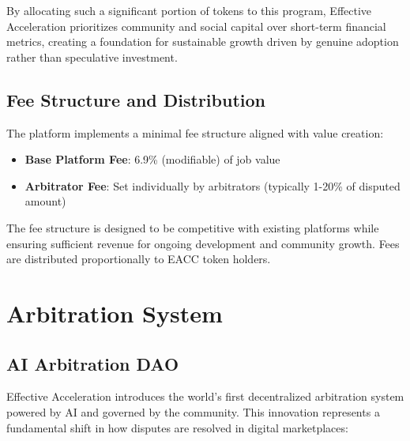 \documentclass{article}
\begin{document}
By allocating such a significant portion of tokens to this program, Effective Acceleration prioritizes community and social capital over short-term financial metrics, creating a foundation for sustainable growth driven by genuine adoption rather than speculative investment.

\subsection{Fee Structure and Distribution}

The platform implements a minimal fee structure aligned with value creation:

\begin{itemize}
    \item \textbf{Base Platform Fee}: 6.9\% (modifiable) of job value
    \item \textbf{Arbitrator Fee}: Set individually by arbitrators (typically 1-20\% of disputed amount)
\end{itemize}

The fee structure is designed to be competitive with existing platforms while ensuring sufficient revenue for ongoing development and community growth. Fees are distributed proportionally to EACC token holders.

\section{Arbitration System}

\subsection{AI Arbitration DAO}

Effective Acceleration introduces the world's first decentralized arbitration system powered by AI and governed by the community. This innovation represents a fundamental shift in how disputes are resolved in digital marketplaces:
\end{document}
